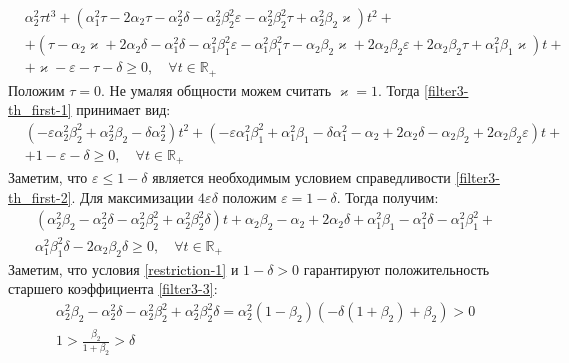 \documentclass[a4paper,14pt]{article} %
\theoremstyle{cited}
\begin{document}
 \begin{equation}\label{filter3-th_first-1}
 \begin{aligned}
&\alpha_2^2\tau t^3 + (\alpha_1^2\tau - 2\alpha_2\tau - \alpha_2^2\delta - \alpha_2^2\beta_2^2\varepsilon - \alpha_2^2\beta_2^2\tau + \alpha_2^2\beta_2\varkappa)t^2 +\\
&+ (\tau - \alpha_2\varkappa + 2\alpha_2\delta - \alpha_1^2\delta - \alpha_1^2\beta_1^2\varepsilon - \alpha_1^2\beta_1^2\tau - \alpha_2\beta_2\varkappa + 2\alpha_2\beta_2\varepsilon + 2\alpha_2\beta_2\tau + \alpha_1^2\beta_1\varkappa)t + \\
&+ \varkappa - \varepsilon - \tau - \delta \geqslant 0, \quad \forall t \in \mathbb{R_+}
 \end{aligned}
\end{equation}
Положим $\tau = 0$. Не умаляя общности можем считать $\varkappa = 1$. Тогда \eqref{filter3-th_first-1} принимает вид:
 \begin{equation}\label{filter3-th_first-2}
 \begin{aligned}
&(-\varepsilon\alpha_2^2\beta_2^2 + \alpha_2^2\beta_2 - \delta\alpha_2^2)t^2 + (-\varepsilon\alpha_1^2\beta_1^2 + \alpha_1^2\beta_1 - \delta\alpha_1^2 - \alpha_2 + 2\alpha_2\delta - \alpha_2\beta_2 + 2\alpha_2\beta_2\varepsilon)t +\\
& + 1 - \varepsilon - \delta \geqslant 0, \quad \forall t \in \mathbb{R_+}
 \end{aligned}
\end{equation}
Заметим, что $\varepsilon \leqslant 1 - \delta$ является необходимым условием справедливости \eqref{filter3-th_first-2}. Для максимизации $4\varepsilon\delta$ положим $\varepsilon = 1-\delta$. Тогда получим:
 \begin{equation}\label{filter3-3}
 \begin{aligned}
&(\alpha_2^2\beta_2 - \alpha_2^2\delta - \alpha_2^2\beta_2^2 + \alpha_2^2\beta_2^2\delta)t + \alpha_2\beta_2 - \alpha_2 + 2\alpha_2\delta + \alpha_1^2\beta_1 - \alpha_1^2\delta - \alpha_1^2\beta_1^2 + \\
&\alpha_1^2\beta_1^2\delta - 2\alpha_2\beta_2\delta \geqslant 0, \quad \forall t \in \mathbb{R_+}
 \end{aligned}
\end{equation}
Заметим, что условия \eqref{restriction-1} и $1-\delta > 0$ гарантируют положительность старшего коэффициента \eqref{filter3-3}: 
 \begin{equation}
 \begin{aligned}
&\alpha_2^2\beta_2 - \alpha_2^2\delta - \alpha_2^2\beta_2^2 + \alpha_2^2\beta_2^2\delta = \alpha_2^2(1-\beta_2)( - \delta(1+\beta_2) + \beta_2) > 0\\
&1 > \frac{\beta_2}{1+\beta_2} > \delta
 \end{aligned}
\end{equation}
\end{document}
